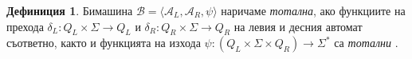 \documentclass[11pt, oneside]{article}
\theoremstyle{definition}
\newtheorem{definition}{Дефиниция}[section]
\begin{document}
\begin{definition}
	Бимашина \( \mathcal{B} = \langle \mathcal{A}_L, \mathcal{A}_R, \psi \rangle \) наричаме \emph{тотална}, ако функциите на прехода \( \delta_L: Q_L \times \Sigma \to Q_L \) и \( \delta_R: Q_R \times \Sigma \to Q_R \) на левия и десния автомат съответно, както и функцията на изхода \( \psi: (Q_L \times \Sigma \times Q_R) \to \Sigma^* \) са \emph{тотални }.
\end{definition}

\end{document}
